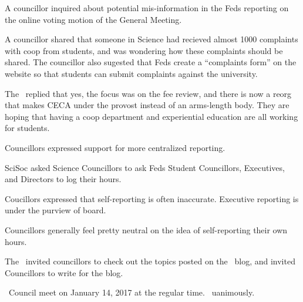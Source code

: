 \begin{information}
    A councillor inquired about potential mis-information in the Feds reporting
    on the online voting motion of the General Meeting.
\end{information}

\begin{information}
    A councillor shared that someone in Science had recieved almost 1000
    complaints with coop from students, and was wondering how these complaints
    should be shared. The councillor also sugested that Feds create a
    ``complaints form'' on the website so that students can submit complaints
    against the university.

    The \vped\ replied that yes, the focus was on the fee review, and there is
    now a reorg that makes CECA under the provost instead of an arms-length
    body. They are hoping that having a coop department and experiential
    education are all working for students. 

    Councillors expressed support for more centralized reporting. 
\end{information}

\begin{information}
    SciSoc asked Science Councillors to ask Feds Student Councillors, 
    Executives, and Directors to log their hours. 

    Coucillors expressed that self-reporting is often inaccurate. Executive
    reporting is under the purview of board. 

    Councillors generally feel pretty neutral on the idea of self-reporting 
    their own hours. 
\end{information}

\begin{information}
    The \vped\ invited councillors to check out the topics posted on the \ousa\
    blog, and invited Councillors to write for the blog. 
\end{information}

\begin{motion}
    \birt\ Council meet on January 14, 2017 at the regular time. 
    \movers{\jason}{\brian}
    \carries\ uanimously.
\end{motion}

